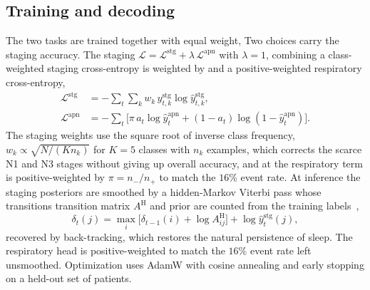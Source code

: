 \documentclass[journal]{IEEEtran}
\providecommand{\DIFaddtex}[1]{{\protect\color{blue} \sf #1}} %
\providecommand{\DIFdeltex}[1]{{\protect\color{red} \scriptsize #1}} %
\providecommand{\DIFaddbegin}{} %
\providecommand{\DIFaddend}{} %
\providecommand{\DIFdelbegin}{} %
\providecommand{\DIFdelend}{} %
\providecommand{\DIFadd}[1]{\texorpdfstring{\DIFaddtex{#1}}{#1}} %
\providecommand{\DIFdel}[1]{\texorpdfstring{\DIFdeltex{#1}}{}} %
\providecommand{\DIFscaledelfig}{0.5}
\newlength{\DIFdelgraphicswidth} %
\newlength{\DIFdelgraphicsheight} %
\providecommand{\DIFaddincludegraphics}[2][]{{\color{blue}\fbox{\DIFOincludegraphics[#1]{#2}}}} %
\providecommand{\DIFdelincludegraphics}[2][]{%
\sbox{\DIFdelgraphicsbox}{\DIFOincludegraphics[#1]{#2}}%
\settoboxwidth{\DIFdelgraphicswidth}{\DIFdelgraphicsbox} %
\settoboxtotalheight{\DIFdelgraphicsheight}{\DIFdelgraphicsbox} %
\scalebox{\DIFscaledelfig}{%
\parbox[b]{\DIFdelgraphicswidth}{\usebox{\DIFdelgraphicsbox}\\[-\baselineskip] \rule{\DIFdelgraphicswidth}{0em}}\llap{\resizebox{\DIFdelgraphicswidth}{\DIFdelgraphicsheight}{%
\setlength{\unitlength}{\DIFdelgraphicswidth}%
\begin{picture}(1,1)%
\thicklines\linethickness{2pt} %
{\color[rgb]{1,0,0}\put(0,0){\framebox(1,1){}}}%
{\color[rgb]{1,0,0}\put(0,0){\line( 1,1){1}}}%
{\color[rgb]{1,0,0}\put(0,1){\line(1,-1){1}}}%
\end{picture}%
}\hspace*{3pt}}} %
} %
\DeclareRobustCommand{\DIFaddbegin}{\DIFOaddbegin \let\includegraphics\DIFaddincludegraphics} %
\DeclareRobustCommand{\DIFaddend}{\DIFOaddend \let\includegraphics\DIFOincludegraphics} %
\DeclareRobustCommand{\DIFdelbegin}{\DIFOdelbegin \let\includegraphics\DIFdelincludegraphics} %
\DeclareRobustCommand{\DIFdelend}{\DIFOaddend \let\includegraphics\DIFOincludegraphics} %
\begin{document}
\subsection{Training and decoding}
The two tasks are trained together with equal weight, \DIFdelbegin %
\DIFdel{Two choices carry the staging accuracy. The staging }\DIFdelend \DIFaddbegin \DIFadd{$\mathcal{L}=\mathcal{L}^{\mathrm{stg}}+\lambda\,\mathcal{L}^{\mathrm{apn}}$ with $\lambda=1$, combining a class-weighted staging }\DIFaddend cross-entropy \DIFdelbegin \DIFdel{is weighted by }\DIFdelend \DIFaddbegin \DIFadd{and a positive-weighted respiratory cross-entropy,
}\begin{align}
\mathcal{L}^{\mathrm{stg}}&=-\sum_t\sum_{k}w_k\,y^{\mathrm{stg}}_{t,k}\log\hat y^{\mathrm{stg}}_{t,k},\\
\mathcal{L}^{\mathrm{apn}}&=-\sum_t\big[\pi\,a_t\log\hat y^{\mathrm{apn}}_t+(1-a_t)\log(1-\hat y^{\mathrm{apn}}_t)\big].
\end{align}
\DIFadd{The staging weights use }\DIFaddend the square root of inverse class frequency,
\DIFaddbegin \DIFadd{$w_k\propto\sqrt{N/(K n_k)}$ for $K=5$ classes with $n_k$ examples, }\DIFaddend which corrects the scarce
N1 and N3 stages without giving up overall accuracy, and \DIFdelbegin \DIFdel{at }\DIFdelend \DIFaddbegin \DIFadd{the respiratory term is
positive-weighted by $\pi=n_-/n_+$ to match the $16\%$ event rate. At }\DIFaddend inference the staging
posteriors are smoothed by a hidden-Markov Viterbi pass whose \DIFdelbegin \DIFdel{transitions }\DIFdelend \DIFaddbegin \DIFadd{transition matrix $A^{\mathrm H}$
and prior }\DIFaddend are counted from the training labels~\cite{chen2024hmm},
\DIFaddbegin \begin{equation}
\delta_t(j)=\max_i\big[\delta_{t-1}(i)+\log A^{\mathrm H}_{ij}\big]+\log\hat y^{\mathrm{stg}}_t(j),
\end{equation}
\DIFadd{recovered by back-tracking, }\DIFaddend which restores the natural persistence of sleep. The respiratory
head is \DIFdelbegin \DIFdel{positive-weighted to match
the $16\%$ event rate}\DIFdelend \DIFaddbegin \DIFadd{left unsmoothed}\DIFaddend . Optimization uses AdamW with cosine annealing and early stopping on a
held-out set of patients.
\end{document}
